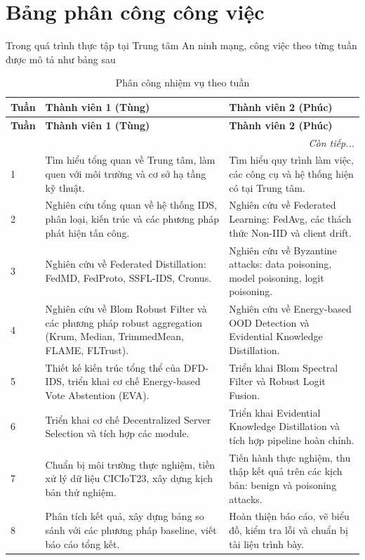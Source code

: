 
\appendix
\chapter{Bảng phân công công việc}

Trong quá trình thực tập tại Trung tâm An ninh mạng, công việc theo từng tuần được mô tả như bảng sau

\begin{longtable}{|p{1.1cm}|p{6.2cm}|p{6.2cm}|}
\caption{Phân công nhiệm vụ theo tuần}
\label{tab:task_assignment}\\
\hline
\textbf{Tuần} & \textbf{Thành viên 1 (Tùng)} & \textbf{Thành viên 2 (Phúc)} \\
\hline
\endfirsthead

\hline
\textbf{Tuần} & \textbf{Thành viên 1 (Tùng)} & \textbf{Thành viên 2 (Phúc)} \\
\hline
\endhead

\hline
\multicolumn{3}{|r|}{\textit{Còn tiếp...}} \\
\endfoot

\hline
\endlastfoot

1 & Tìm hiểu tổng quan về Trung tâm, làm quen với môi trường và cơ sở hạ tầng kỹ thuật. & Tìm hiểu quy trình làm việc, các công cụ và hệ thống hiện có tại Trung tâm. \\
\hline
2 & Nghiên cứu tổng quan về hệ thống IDS, phân loại, kiến trúc và các phương pháp phát hiện tấn công. & Nghiên cứu về Federated Learning: FedAvg, các thách thức Non-IID và client drift. \\
\hline
3 & Nghiên cứu về Federated Distillation: FedMD, FedProto, SSFL-IDS, Cronus. & Nghiên cứu về Byzantine attacks: data poisoning, model poisoning, logit poisoning. \\
\hline
4 & Nghiên cứu về Blom Robust Filter và các phương pháp robust aggregation (Krum, Median, TrimmedMean, FLAME, FLTrust). & Nghiên cứu về Energy-based OOD Detection và Evidential Knowledge Distillation. \\
\hline
5 & Thiết kế kiến trúc tổng thể của DFD-IDS, triển khai cơ chế Energy-based Vote Abstention (EVA). & Triển khai Blom Spectral Filter và Robust Logit Fusion. \\
\hline
6 & Triển khai cơ chế Decentralized Server Selection và tích hợp các module. & Triển khai Evidential Knowledge Distillation và tích hợp pipeline hoàn chỉnh. \\
\hline
7 & Chuẩn bị môi trường thực nghiệm, tiền xử lý dữ liệu CICIoT23, xây dựng kịch bản thử nghiệm. & Tiến hành thực nghiệm, thu thập kết quả trên các kịch bản: benign và poisoning attacks. \\
\hline
8 & Phân tích kết quả, xây dựng bảng so sánh với các phương pháp baseline, viết báo cáo tổng kết. & Hoàn thiện báo cáo, vẽ biểu đồ, kiểm tra lỗi và chuẩn bị tài liệu trình bày. \\
\hline
\end{longtable}

\vspace{1cm}

\pagebreak
